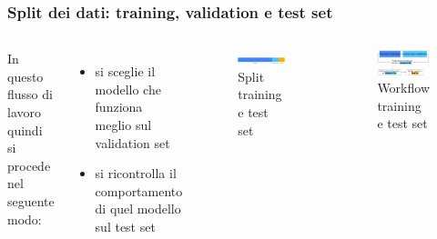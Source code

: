 \begin{frame}

	\frametitle{Split dei dati: training, validation e test set}
	\begin{columns}
		In questo flusso di lavoro quindi si procede nel seguente modo:
		\begin{itemize}
			\item si sceglie il modello che funziona meglio sul validation set
			\item si ricontrolla il comportamento di quel modello sul test set
		\end{itemize}


		\begin{figure}[!htbp]
			\centering
			\includegraphics[width=1.0\linewidth]{images/supervised/validation_test_splitting_data/Training_Test_Validation_1.pdf}
			\caption{Split training e test set}
		\end{figure}

		\begin{figure}[!htbp]
			\centering
			\includegraphics[width=1.0\linewidth]{images/supervised/validation_test_splitting_data/Training_Test_Validation_2.pdf}
			\caption{Workflow training e test set}
		\end{figure}

	\end{columns}
\end{frame}


